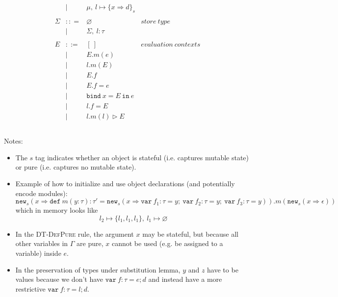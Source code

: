 \documentclass{llncs}
\newcommand{\keywadj}[1]{\mathtt{#1}}
\newcommand{\keyw}[1]{\keywadj{#1}~}
\begin{document}
\[\begin{array}{lll}
\begin{array}{lllr}
& | & \mu,~l \mapsto \{ x \Rightarrow d \}_{s}\\
&&\\
\Sigma & :: = & \varnothing & store~type\\
& | & \Sigma,~l : \tau\\
&&\\
E & ::= & [~] & evaluation~ contexts\\
  & |   & E.m(e)\\
  & |   & l.m(E)\\
  & |   & E.f \\
  & |   & E.f = e \\
  & |   & \keyw{bind} x = E~\keyw{in} e \\
  & |   & l.f = E \\
  & |   & l.m(l) \rhd E \\
&&\\
\end{array}
\end{array}
\]

\noindent Notes:

\begin{itemize}
\item The $s$ tag indicates whether an object is stateful (i.e. captures mutable state) or pure (i.e. captures no mutable state).
\item Example of how to initialize and use object declarations (and potentially encode modules):
\[
\keywadj{new}_{s}(x \Rightarrow \keyw{def} m(y : \tau) : \tau' = \keywadj{new}_{s}(x \Rightarrow \keyw{var} f_1 : \tau = y;~\keyw{var} f_2 : \tau = y;~\keyw{var} f_3 : \tau = y)).m(\keywadj{new}_{s} (x \Rightarrow \epsilon))
\]
which in memory looks like 
\[
l_2 \mapsto \{l_1,l_1,l_1\},~l_1 \mapsto \varnothing
\]
\item In the \textsc{DT-DefPure} rule, the argument $x$ may be stateful, but because all other variables in $\Gamma$ are pure, $x$ cannot be used (e.g. be assigned to a variable) inside $e$.
\item In the preservation of types under substitution lemma, $y$ and $z$ have to be values because we don't have $\keyw{var} f:\tau = e; d$ and instead have a more restrictive $\keyw{var} f:\tau = l;d$.
\end{itemize}
\end{document}
